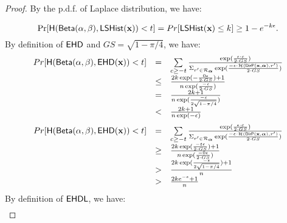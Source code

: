 \documentclass{article}
\begin{document}
\begin{proof}
By the p.d.f. of Laplace distribution, we have:

\[
	\Pr[\mathsf{H}(\mathsf{Beta}(\alpha, \beta), \mathsf{LSHist}(\textbf{x}))< t]
	= Pr[\mathsf{LSHist}(\textbf{x}) \leq k] 
	\geq 1 - e^{-k\epsilon}.
\]
%
%
By definition of $\mathsf{EHD}$ and $GS = \sqrt{1 - \pi/4}$, we have:
%
%
\[
	\begin{array}{lcl}
	Pr[\mathsf{H}(\mathsf{Beta}(\alpha, \beta), \mathsf{EHD}(\textbf{x})) < t] 
	& =  & \sum\limits_{c \geq - t}
	\frac
  {\exp(\frac{\epsilon\cdot c}{2\cdot GS})}
{\Sigma_{r' \in \mathcal{R}_{\boldsymbol{\alpha}}}\exp(\frac{-\epsilon\cdot \mathcal{H}(\mathsf{DirP}(\textbf{x},\boldsymbol{\alpha}), r')}{2\cdot GS})}\\
 	& \leq &
 	\frac
  	{2k\exp(-\frac{0\epsilon }{2\cdot GS}) + 1}
	{n\exp(\frac{-\epsilon }{2\cdot GS})}\\
 	& = &
 	\frac
  	{2k + 1}
	{n\exp(\frac{-\epsilon }{2\sqrt{1 - \pi/4}})}\\
	& < & 
 	\frac
  	{2k + 1}
	{n\exp(-\epsilon)}
\end{array}
\]
\[
	\begin{array}{lcl}
	Pr[\mathsf{H}(\mathsf{Beta}(\alpha, \beta), \mathsf{EHD}(\textbf{x})) < t] 
	& =  & \sum\limits_{c \geq - t}
	\frac
  	{\exp(\frac{\epsilon\cdot c}{2\cdot GS})}
	{\Sigma_{r' \in \mathcal{R}_{\boldsymbol{\alpha}}}\exp(\frac{-\epsilon\cdot \mathcal{H}(\mathsf{DirP}(\textbf{x},\boldsymbol{\alpha}), r')}{2\cdot GS})}\\
 	& \geq &
 	\frac
  	{2k\exp(\frac{-t\epsilon }{2\cdot GS}) + 1}
	{n\exp(\frac{-0\epsilon }{2\cdot GS})}\\
 	& > &
 	\frac
  	{2k\exp(\frac{-\epsilon }{2\sqrt{1 - \pi/4}}) + 1}
	{n}\\
	& > & 
 	\frac
  	{2ke^{-\epsilon} + 1}{n}
\end{array}
\]
%
%
By definition of $\mathsf{EHDL}$, we have:
%
%
\[
	\begin{array}{lcl}

\end{array}\]
\end{proof}
\end{document}
